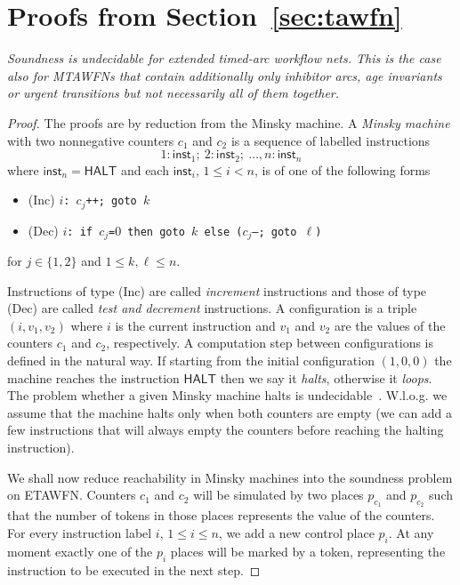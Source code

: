 \section{Proofs from Section~\ref{sec:tawfn}} \label{app:undecid}

{\em
Soundness is undecidable for extended timed-arc workflow nets.
This is the case also for MTAWFNs that contain additionally only
inhibitor arcs, age invariants or urgent transitions but not necessarily
all of them together.
}
\begin{proof}
The proofs are by reduction from the Minsky machine.
A \emph{Minsky machine} with two nonnegative counters $c_1$ and $c_2$ is
a sequence of labelled instructions
$$1:\mathsf{inst}_1;\ 2:\mathsf{inst}_2;\ \ldots, n:\mathsf{inst}_n$$
where $\mathsf{inst}_n = \mathsf{HALT}$ 
and each $\mathsf{inst}_i$, $1\le i < n$, is of one of the following forms
\begin{itemize}
\item
{(Inc)} \hspace{5mm} {\tt $i$: $c_j$++; goto $k$}
\item
{(Dec)} \hspace{4mm} {\tt $i$: if $c_j$=$0$ then goto $k$ else 
 ($c_j$--; goto $\ell$)}
\end{itemize}
for $j\in \{1,2\}$ and $1\le k,\ell \le n$.

Instructions of type (Inc) are called \emph{increment} instructions and
those of type (Dec) are called \emph{test and decrement} instructions.
A configuration is a triple $(i, v_1, v_2)$ where $i$ is the current
instruction and $v_1$ and $v_2$ are the values of the counters $c_1$
and $c_2$, respectively. A computation step between configurations is
defined in the natural way. If starting from the initial
configuration $(1,0,0)$ the machine reaches the instruction $\mathsf{HALT}$
then we say it \emph{halts}, otherwise it \emph{loops}.
%
The problem whether a given Minsky machine halts 
is undecidable~\cite{Minsky:book}. W.l.o.g. we assume
that the machine halts only when both counters are empty
(we can add a few instructions that will always empty the counters
before reaching the halting instruction).

We shall now reduce reachability in Minsky machines into the soundness
problem on ETAWFN. Counters $c_1$ and $c_2$ will be simulated
by two places $p_{c_1}$ and $p_{c_2}$ such that the number of
tokens in those places represents the value of the counters.
For every instruction label $i$, $1 \leq i \leq n$, we
add a new control place $p_i$. At any moment exactly one of the $p_i$
places will be marked by a token, representing the instruction
to be executed in the next step.


\end{proof}
